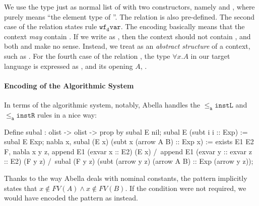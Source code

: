 We use the type  just as normal list of  with two constructors, namely  and , where  purely means ``the element type of ''. The  relation is also pre-defined.
The second case of the relation  states rule $\mathtt{wf_d var}$.
The encoding  basically means that the context \emph{may} contain .
If we write  as , then the context should not contain , and both  and  make no sense.
Instead, we treat  as an \emph{abstract structure} of a context, such as .
For the fourth case of the relation , the type $\forall x. A$ in our target language is expressed as , and its opening $A$, .

\paragraph{Encoding of the Algorithmic System}
In terms of the algorithmic system, notably, Abella handles the
$\mathtt{{\le_a}instL}$ and $\mathtt{{\le_a}instR}$ rules in a nice way:
\begin{abella}
	Define subal : olist -> olist -> prop by
		subal E nil;
		subal E (subt i i :: Exp) := subal E Exp;
		nabla x, subal (E x) (subt x (arrow A B) :: Exp x) :=
			exists E1 E2 F, nabla x y z, append E1 (exvar x :: E2) (E x) /\
				append E1 (exvar y :: exvar z :: E2) (F y z) /\
				subal (F y z) (subt (arrow y z) (arrow A B) :: Exp (arrow y z));
\end{abella}
Thanks to the way Abella deals with nominal constants, the pattern 
 implicitly states that $x\notin FV(A) \land x\notin FV(B)$.
If the condition were not required, we would have encoded the pattern as 
\abellae{subt x (arrow (A x) (B x))} instead.

